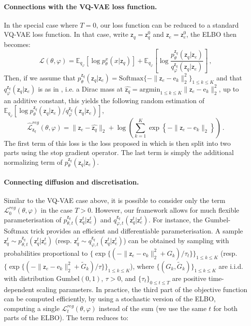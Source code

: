 \documentclass[nolayout]{article}
\theoremstyle{plain}
\theoremstyle{definition}
\theoremstyle{remark}
\newcommand{\latentcont}{\mathsf{z}_e}
\newcommand{\latentdis}{\mathsf{z}_q}
\newcommand{\rme}{\mathrm{e}}
\newcommand{\embed}{\rme}
\begin{document}
\paragraph{Connections with the VQ-VAE loss function. } In the special case where $T=0$, our loss function can be reduced to a standard VQ-VAE loss function. In that case, write $\latentdis = \latentdis^0$ and $\latentcont = \latentcont^0$, the ELBO then becomes: 
$$
\mathcal{L}(\theta,\varphi) = \mathbb{E}_{q_{\varphi}}\left[\log p^x_{\theta}(x|\latentdis)\right]
+ \mathbb{E}_{q_{\varphi}}\left[\log \frac{p_{\theta}^{\latentdis}(\latentdis|\latentcont)}{q_{\varphi}^{\latentdis}(\latentdis|\latentcont)}\right]\,, 
$$
Then, if we assume that $p_{\theta}^{\latentdis}(\latentdis|\latentcont) = \mathrm{Softmax}\{-\|\latentcont - \embed_k\|^2_2\}_{1\leq k \leq K}$ and that  $q_{\varphi}^{\latentdis}(\latentdis|\latentcont)$ is as in \cite{oord2017neural}, i.e. a Dirac mass at $\widehat{\latentdis} = \mathrm{argmin}_{1\leq k \leq K}\|\latentcont - \embed_k\|^2_2$, up to an additive constant, this yields the following random estimation of $\mathbb{E}_{q_{\varphi}}[\log p_{\theta}^{\latentdis}(\latentdis|\latentcont)/q_{\varphi}^{\latentdis}(\latentdis|\latentcont)]$,
$$
    \widehat{\mathcal{L}}^{reg}_{\latentdis}(\theta,\varphi) = \|\latentcont - \widehat{\latentdis}\|_2 + \log \left(\sum_{k=1}^{K}\exp\left\{-\|\latentcont-\embed_k\|_2\right\}\right)\,.
$$
The first term of this loss is the loss proposed in \cite{oord2017neural} which is then split into two parts using the stop gradient operator. The last term is simply the additional normalizing term of  $p_{\theta}^{\latentdis}(\latentdis|\latentcont)$. 

\paragraph{Connecting diffusion and discretisation. } Similar to the VQ-VAE case above, it is possible to consider only the term $\mathcal{L}^{reg}_0(\theta,\varphi)$ in the case $T > 0$. However, our framework allows for much flexible parameterisation of $p_{\theta,t}^{\latentdis}(\latentdis^t|\latentcont^t)$ and $q_{\varphi,t}^{\latentdis}(\latentdis^t|\latentcont^t)$. For instance, the Gumbel-Softmax trick provides an efficient and differentiable parameterisation. A sample $\latentdis^t\sim  p_{\theta,t}^{\latentdis}(\latentdis^t|\latentcont^t)$ (resp. $\latentdis^t\sim q_{\varphi,t}^{\latentdis}(\latentdis^t|\latentcont^t)$) can be obtained by sampling with probabilities proportional to $\{\exp\{(-\|\latentcont - \embed_k\|^2_2 + G_k )/\tau_t\}\}_{1\leq k \leq K}$ (resp. $\{\exp\{(-\|\latentcont - \embed_k\|^2_2 + \tilde G_k )/\tau\}\}_{1\leq k \leq K}$), where $\{(G_k,\tilde G_k)\}_{1\leq k \leq K}$ are i.i.d. with distribution $\mathrm{Gumbel}(0,1)$, $\tau>0$, and $\{\tau_t\}_{0\leq t \leq T}$ are positive  time-dependent scaling parameters. In practice, the third part of the objective function can be computed efficiently, by using a stochastic version of the ELBO, computing a single $\mathcal{L}^{reg}_t(\theta,\varphi)$ instead of the sum (we use the same $t$ for both parts of the ELBO). The term reduces to:
\end{document}
